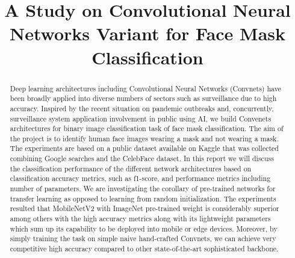 \documentclass[conference]{IEEEtran}
\begin{document}
\title{\textbf{\LARGE A Study on Convolutional Neural Networks Variant for Face Mask Classification}}
\author{
}

\maketitle



\begin{abstract}
Deep learning architectures including Convolutional Neural Networks (Convnets) have been broadly applied into diverse numbers of sectors such as surveillance due to high accuracy. Inspired by the recent situation on pandemic outbreaks and, concurrently, surveillance system application involvement in public using AI, we build Convenets architectures for binary image classification task of face mask classification. The aim of the project is to identify human face images wearing a mask and not wearing a mask. The experiments are based on a public dataset available on Kaggle that was collected combining Google searches and the CelebFace dataset. In this report we will discuss the classification performance of the different network architectures based on classification accuracy metrics, such as f1-score, and performance metrics including number of parameters. We are investigating the corollary of pre-trained networks for transfer learning as opposed to learning  from random initialization. The experiments resulted that MobileNetV2 with ImageNet pre-trained weight is considerably superior among others with the high accuracy metrics along with its lightweight parameters which sum up its capability to be deployed into mobile or edge devices. Moreover, by simply training the task on simple naive hand-crafted Convnets, we can achieve very competitive high accuracy compared to other state-of-the-art sophisticated backbone. 
\end{abstract}
\end{document}
